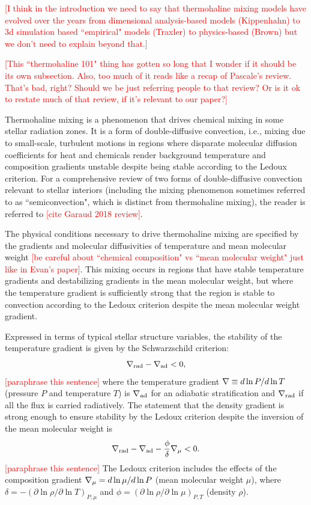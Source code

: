 \textcolor{red}{[I think in the introduction we need to say that thermohaline mixing models have evolved over the years from dimensional analysis-based models (Kippenhahn) to 3d simulation based ``empirical" models (Traxler) to physics-based (Brown) but we don't need to explain beyond that.]}

\textcolor{red}{[This ``thermohaline 101" thing has gotten so long that I wonder if it should be its own subsection. Also, too much of it reads like a recap of Pascale's review. That's bad, right? Should we be just referring people to that review? Or is it ok to restate much of that review, if it's relevant to our paper?]}

Thermohaline mixing is a phenomenon that drives chemical mixing in some stellar radiation zones. 
It is a form of double-diffusive convection, i.e., mixing due to small-scale, turbulent motions in regions where disparate molecular diffusion coefficients for heat and chemicals render background temperature and composition gradients unstable despite being stable according to the Ledoux criterion. 
For a comprehensive review of two forms of double-diffusive convection relevant to stellar interiors (including the mixing phenomenon sometimes referred to as ``semiconvection", which is distinct from thermohaline mixing), the reader is referred to \textcolor{red}{[cite Garaud 2018 review]}. 

The physical conditions necessary to drive thermohaline mixing are specified by the gradients and molecular diffusivities of temperature and mean molecular weight \textcolor{red}{[be careful about ``chemical composition" vs ``mean molecular weight" just like in Evan's paper]}. 
This mixing occurs in regions that have stable temperature gradients and destabilizing gradients in the mean molecular weight, but where the temperature gradient is sufficiently strong that the region is stable to convection according to the Ledoux criterion despite the mean molecular weight gradient. 

Expressed in terms of typical stellar structure variables, the stability of the temperature gradient is given by the Schwarzschild criterion:
\begin{equation} \label{eq:Schwarzschild}
    \gradrad - \gradad < 0,
\end{equation}
\textcolor{red}{[paraphrase this sentence]} where the temperature gradient $\nabla \equiv d \ln P / d \ln T$ (pressure $P$ and temperature $T$) is $\nabla_{\rm{ad}}$ for an adiabatic stratification and $\nabla_{\rm{rad}}$ if all the flux is carried radiatively. 
The statement that the density gradient is strong enough to ensure stability by the Ledoux criterion despite the inversion of the mean molecular weight is
\begin{equation} \label{eq:Ledoux}
    \gradrad - \gradad - \frac{\phi}{\delta}\gradmu < 0.
\end{equation}
\textcolor{red}{[paraphrase this sentence]} The Ledoux criterion includes the effects of the composition gradient $\nabla_{\mu} = d\ln\mu/d\ln P$ (mean molecular weight $\mu$), where $\delta = -(\partial \ln \rho / \partial \ln T)_{P,\mu}$ and $\phi = (\partial \ln \rho / \partial \ln\mu)_{P,T}$ (density $\rho$).

